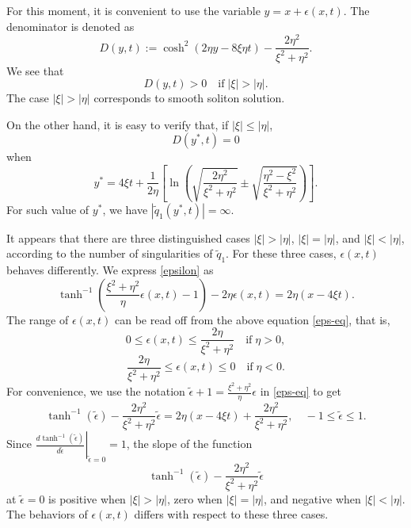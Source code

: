 \documentclass[11pt]{article}
\begin{document}
For this moment, it is convenient to use the variable $y=x+\epsilon(x,t)$. The denominator is denoted as 
$$D(y,t):=\cosh^2(2\eta y-8\xi\eta t)-\frac{2\eta^2}{\xi^2+\eta^2}.$$
We see that
$$D(y,t) >0\quad \mbox{if}\; |\xi|>|\eta|.$$
The case $|\xi|>|\eta|$ corresponds to smooth soliton solution.

On the other hand, it is easy to verify that, if $|\xi| \leq |\eta|$,
$$D(y^*,t)=0$$
when
\begin{equation}\label{zero-y}
y^*=4\xi t +\frac{1}{2\eta}\left[\ln\left(\sqrt{\frac{2\eta^2}{\xi^2+\eta^2}}\pm \sqrt{\frac{\eta^2-\xi^2}{\xi^2+\eta^2}}\right)\right].
\end{equation}
For such value of $y^*$, we have $|\tilde{q}_1(y^*,t)|=\infty$. 

It appears that there are three distinguished cases $|\xi|>|\eta|$, $|\xi|=|\eta|$, and $|\xi|<|\eta|$, according to the number of singularities of $\tilde{q}_1$. For these three cases, $\epsilon(x,t)$ behaves differently. We express \eqref{epsilon} as
\begin{equation} \label{eps-eq}
\tanh^{-1}\left(\frac{\xi^2+\eta^2}{\eta}\epsilon(x,t)-1\right)-2\eta \epsilon(x,t)=2\eta(x-4\xi t).
\end{equation}
The range of $\epsilon(x,t)$ can be read off from the above equation \eqref{eps-eq}, that is,%
$$0\leq \epsilon(x,t) \leq \frac{2\eta}{\xi^2+\eta^2} \quad \mbox{if}\; \eta>0,$$
$$ \frac{2\eta}{\xi^2+\eta^2}\leq \epsilon(x,t) \leq 0 \quad \mbox{if}\; \eta<0.$$
For convenience, we use the notation $\tilde{\epsilon}+1=\frac{\xi^2+\eta^2}{\eta}\epsilon$ in \eqref{eps-eq} to get
\begin{equation}\label{eps-eq-2}
\tanh^{-1}\left(\tilde{\epsilon} \right)-\frac{2\eta^2}{\xi^2+\eta^2} \tilde{\epsilon}=2\eta(x-4\xi t)+\frac{2\eta^2}{\xi^2+\eta^2}, \quad -1\leq \tilde{\epsilon}\leq 1.
\end{equation}
Since $\left.\frac{d \tanh^{-1}(\tilde{\epsilon})}{d\tilde{\epsilon}}\right|_{\tilde{\epsilon}=0}=1$,  the slope of the function 
$$\tanh^{-1}\left(\tilde{\epsilon} \right)-\frac{2\eta^2}{\xi^2+\eta^2} \tilde{\epsilon}$$
at $\tilde{\epsilon}=0$ is positive when $|\xi|>|\eta|$, zero when $|\xi|=|\eta|$, and negative when $|\xi|<|\eta|$. %
The behaviors of $\epsilon(x,t)$ differs with respect to these three cases. 
\end{document}
